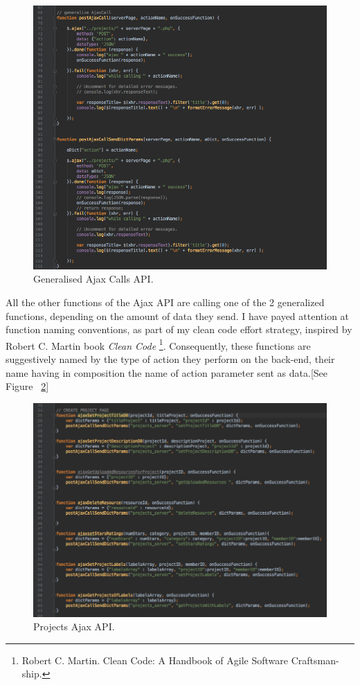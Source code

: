 \begin{figure}
\includegraphics[width=1\linewidth]{images/GeneralisedAjaxCallsAPI.png}
\caption{Generalised Ajax Calls API.}
\label{fig:general_ajax_calls}
\end{figure}

All the other functions of the Ajax API are calling one of the 2 generalized functions, depending on the amount of data they send. 
I have payed attention at function naming conventions, as part of my clean code effort strategy, inspired by Robert C. Martin book \textit{Clean Code} \footnote{Robert C. Martin. Clean Code: A Handbook of Agile Software Craftsman-
ship.}. Consequently, these functions are suggestively named by the type of action they perform on the back-end, their name having in composition the name of action parameter sent as data.[See Figure ~\ref{fig:ajax_projects_API}] \\

\begin{figure}
\includegraphics[width=1\linewidth]{images/AjaxProjectsAPI.png}
\caption{Projects Ajax API.}
\label{fig:ajax_projects_API}
\end{figure}


